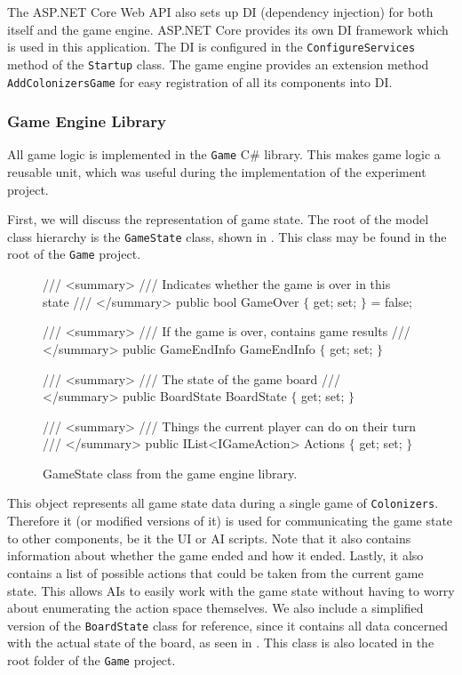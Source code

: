 The ASP.NET Core Web API also sets up DI (dependency injection) for both itself and
the game engine. ASP.NET Core provides its own DI framework
which is used in this application. The DI is configured in the
\texttt{ConfigureServices} method of the \texttt{Startup} class.
The game engine provides an extension method \texttt{AddColonizersGame}
for easy registration of all its components into DI.

\subsubsection{Game Engine Library}
\label{subsub:gelibrary}

All game logic is implemented in the \texttt{Game} C\# library. This
makes game logic a reusable unit, which was useful during the implementation of
the experiment project.

First, we will discuss the representation of game state. The root
of the model class hierarchy is the \texttt{GameState} class, shown in .
This class may be found in the root of the \texttt{Game} project.

\begin{figure}[ht]
\begin{code}[commandchars=\\\{\},codes={\catcode`\$=3\catcode`\^=7\catcode`\_=8}]
/// <summary>
/// Indicates whether the game is over in this state
/// </summary>
public bool GameOver $\{$ get; set; $\}$ = false;

/// <summary>
/// If the game is over, contains game results
/// </summary>
public GameEndInfo GameEndInfo $\{$ get; set; $\}$

/// <summary>
/// The state of the game board
/// </summary>
public BoardState BoardState $\{$ get; set; $\}$

/// <summary>
/// Things the current player can do on their turn
/// </summary>
public IList<IGameAction> Actions $\{$ get; set; $\}$
\end{code}
\caption{GameState class from the game engine library.}\label{dd:gamestate}
\end{figure}

This object represents all game state data during a single game of \texttt{Colonizers}.
Therefore it (or modified versions of it) is used for communicating the game state
to other components, be it the UI or AI scripts. Note that it also contains information
about whether the game ended and how it ended. Lastly, it also contains a list of possible
actions that could be taken from the current game state. This allows AIs to easily
work with the game state without having to worry about enumerating the action
space themselves. We also include a simplified version of the \texttt{BoardState} class
for reference,
since it contains all data concerned with the actual state of the board, as seen
in . This class is also located in the root folder
of the \texttt{Game} project.

